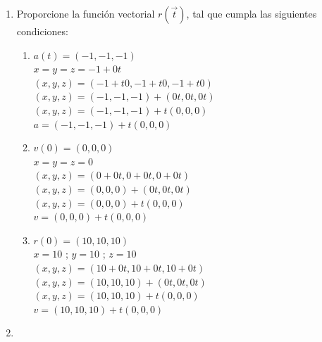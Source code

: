 \documentclass[10pt,letterpaper,fleqn]{article}
\begin{document}
\begin{enumerate}
        \item Proporcione la función vectorial $r(\overrightarrow{t})$, tal que cumpla las siguientes condiciones:
        \begin{enumerate}
            \item $a(t)=(-1,-1,-1)$ \\
            $x = y = z = -1 + 0t$ \\
            $(x,y,z)=(-1+ t0,-1+ t0,-1+ t0)$ \\
            $(x,y,z)=(-1,-1,-1)+(0t,0t,0t)$ \\
            $(x,y,z)=(-1,-1,-1)+t(0,0,0)$ \\
            $a=(-1,-1,-1)+t(0,0,0)$ 
            \item $v(0)=(0,0,0)$ \\
            $x=y=z=0$ \\
            $(x,y,z) = (0+0t,0+0t,0+0t)$ \\
            $(x,y,z) = (0,0,0)+(0t,0t,0t)$ \\
            $(x,y,z) = (0,0,0)+t(0,0,0)$ \\
            $v = (0,0,0)+t(0,0,0)$ 

            \item $r(0)=(10,10,10)$ \\
            $x=10$ ; $y=10$ ; $z=10$ \\
            $(x,y,z) = (10+0t,10+0t,10+0t)$ \\
            $(x,y,z) = (10,10,10)+(0t,0t,0t)$ \\
            $(x,y,z) = (10,10,10)+t(0,0,0)$ \\ 
            $v = (10,10,10)+t(0,0,0)$

        \end{enumerate}

        \item


\end{enumerate}
\end{document}
